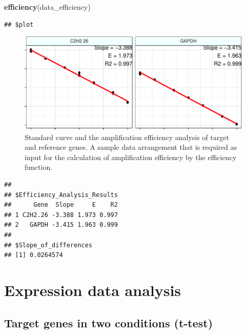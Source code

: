 \documentclass[
]{article}
\newenvironment{Shaded}{\begin{snugshade}}{\end{snugshade}}
\newcommand{\FunctionTok}[1]{\textcolor[rgb]{0.13,0.29,0.53}{\textbf{#1}}}
\newcommand{\NormalTok}[1]{#1}
\begin{document}
\begin{Shaded}
\begin{Highlighting}[]
\FunctionTok{efficiency}\NormalTok{(data\_efficiency)}
\end{Highlighting}
\end{Shaded}

\begin{verbatim}
## $plot
\end{verbatim}

\begin{figure}

{\centering \includegraphics{vignette_files/figure-latex/unnamed-chunk-4-1} 

}

\caption{Standard curve and the amplification efficiency analysis of target and reference genes. A sample data arrangement that is required as input for the calculation of amplification efficiency by the efficiency function.}\label{fig:unnamed-chunk-4}
\end{figure}

\begin{verbatim}
## 
## $Efficiency_Analysis_Results
##      Gene  Slope     E    R2
## 1 C2H2.26 -3.388 1.973 0.997
## 2   GAPDH -3.415 1.963 0.999
## 
## $Slope_of_differences
## [1] 0.0264574
\end{verbatim}

\hypertarget{expression-data-analysis}{%
\section{Expression data analysis}\label{expression-data-analysis}}

\hypertarget{target-genes-in-two-conditions-t-test}{%
\subsection{Target genes in two conditions
(t-test)}\label{target-genes-in-two-conditions-t-test}}
\end{document}
